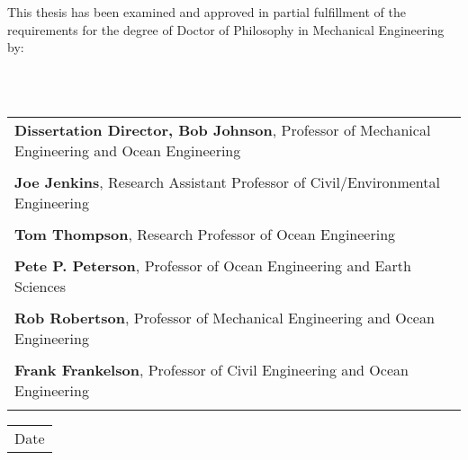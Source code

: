 \documentclass[12pt]{unhthesis}
\begin{document}
\thispagestyle{empty}

\noindent \small{This thesis has been examined and approved in partial
fulfillment of the requirements for the degree of Doctor of Philosophy in
Mechanical Engineering by:}

\begin{tabular}{l}

\end{tabular}

\vspace{12mm}
\begin{flushright}

\begin{singlespace}
\tabletail
   {\hline {}\\}
\tablelasttail{}
\begin{supertabular}{p{13cm}}
      \hline
         \textbf{Dissertation Director, Bob Johnson},
         \small{Professor of Mechanical Engineering and Ocean Engineering} \\
         \vspace{5mm} \\
      \hline
         \textbf{Joe Jenkins},
         \small{Research Assistant Professor of Civil/Environmental Engineering}
         \\
         \vspace{5mm}\\
      \hline
         \textbf{Tom Thompson},
         \small{Research Professor of Ocean Engineering} \\
         \vspace{5mm}\\
      \hline
         \textbf{Pete P. Peterson},
         \small{Professor of Ocean Engineering and Earth Sciences} \\
         \vspace{5mm}\\
      \hline
         \textbf{Rob Robertson},
         \small{Professor of Mechanical Engineering and Ocean Engineering} \\
         \vspace{5mm}\\
      \hline
         \textbf{Frank Frankelson},
         \small{Professor of Civil Engineering and Ocean Engineering} \\
         \vspace{12mm}\\
    \end{supertabular}

    \begin{tabular*}{2in}{l}
      \hline
        Date
    \end{tabular*}

\vspace{12mm}

\end{singlespace}
\end{flushright}
\end{document}
